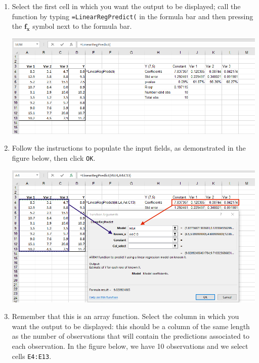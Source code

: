 \documentclass[12pt]{article}
\begin{document}
\begin{enumerate}
\item Select the first cell in which you want the output to be displayed; call the function by typing \texttt{=LinearRegPredict(} in the formula bar and then pressing the $\boldsymbol{f_x}$ symbol next to the formula bar.

\medskip

\centerline{\includegraphics[width=6in]{figures/LinRegPred1}}

\medskip

\item Follow the instructions to populate the input fields, as demonstrated in the figure below, then click \texttt{OK}.

\medskip

\centerline{\includegraphics[width=6in]{figures/LinRegPred2}}

\medskip

\item Remember that this is an array function. Select the column in which you want the output to be displayed: this should be a column of the same length as the number of observations that will contain the predictions associated to each observation. In the figure below, we have 10 observations and we select cells \texttt{E4:E13}.


\end{enumerate}
\end{document}
